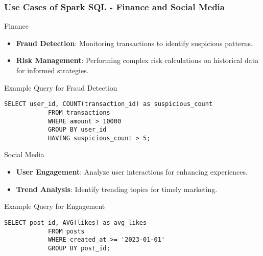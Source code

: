 \documentclass[aspectratio=169]{beamer}
\begin{document}
\begin{frame}[fragile]
    \frametitle{Use Cases of Spark SQL - Finance and Social Media}
    \begin{block}{Finance}
        \begin{itemize}
            \item \textbf{Fraud Detection}: Monitoring transactions to identify suspicious patterns.
            \item \textbf{Risk Management}: Performing complex risk calculations on historical data for informed strategies.
        \end{itemize}
        \begin{exampleblock}{Example Query for Fraud Detection}
            \begin{lstlisting}[style=mystyle]
            SELECT user_id, COUNT(transaction_id) as suspicious_count 
            FROM transactions 
            WHERE amount > 10000 
            GROUP BY user_id 
            HAVING suspicious_count > 5;
            \end{lstlisting}
        \end{exampleblock}
    \end{block}
    
    \begin{block}{Social Media}
        \begin{itemize}
            \item \textbf{User Engagement}: Analyze user interactions for enhancing experiences.
            \item \textbf{Trend Analysis}: Identify trending topics for timely marketing.
        \end{itemize}
        \begin{exampleblock}{Example Query for Engagement}
            \begin{lstlisting}[style=mystyle]
            SELECT post_id, AVG(likes) as avg_likes 
            FROM posts 
            WHERE created_at >= '2023-01-01' 
            GROUP BY post_id;
            \end{lstlisting}
        \end{exampleblock}
    \end{block}
\end{frame}
\end{document}
